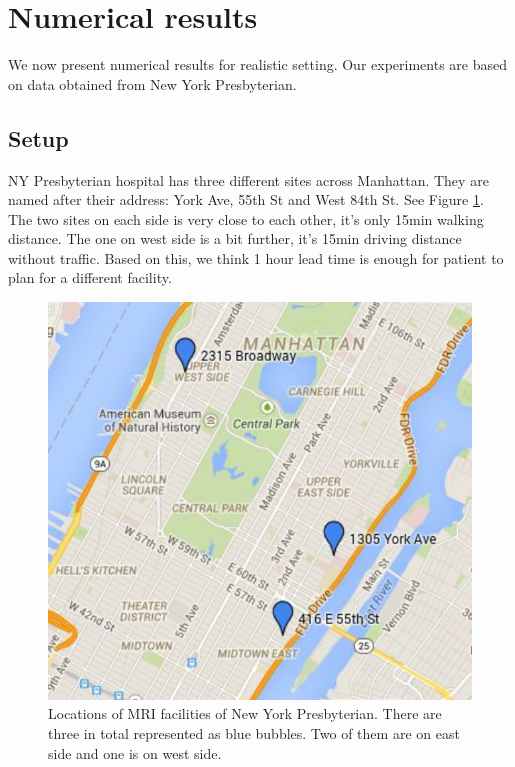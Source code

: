 \section{Numerical results}

We now present numerical results for realistic setting. Our experiments
are based on data obtained from New York Presbyterian.

\subsection{Setup}

NY Presbyterian hospital has three different sites across Manhattan.
They are named after their address: York Ave, 55th St and West 84th St.
See Figure \ref{fig:site}. The two sites on each side is very close
to each other, it's only 15min walking distance. The one on west side
is a bit further, it's 15min driving distance without traffic.
Based on this, we think 1 hour lead time is enough for patient to
plan for a different facility.

\begin{figure}
\centering
\includegraphics[scale=.6]{chap3/pic/site.pdf}
\caption{Locations of MRI facilities of New York Presbyterian. There
are three in total represented as blue bubbles. Two of them are on
east side and one is on west side.}
\label{fig:site}
\end{figure}


